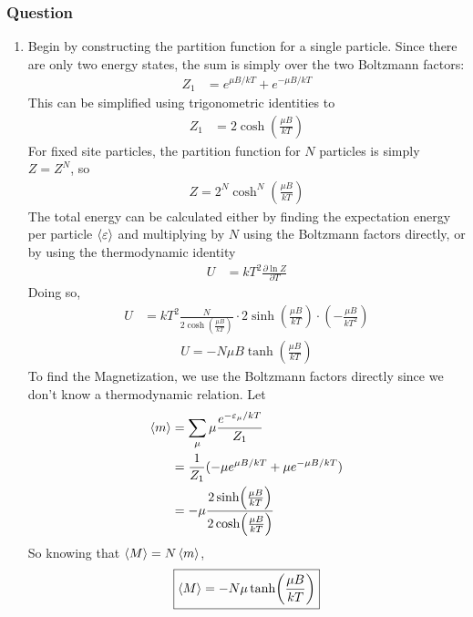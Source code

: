 \subsubsection{Question}
\begin{enumerate}
	\item
		Begin by constructing the partition function for a single particle.
		Since there are only two energy states, the sum is simply over the
		two Boltzmann factors:
		\begin{align*}
			Z_1 &= e^{{\mu} B/kT} + e^{-{\mu} B/kT}
		\end{align*}
		This can be simplified using trigonometric identities to
		\begin{align*}
			Z_1 &= 2 \cosh (\frac{{\mu} B}{kT})
		\end{align*}
		For fixed site particles, the partition function for $N$ particles
		is simply $Z = Z^N$, so
		\begin{align}
			\boxed{
			Z = 2^N \cosh^N (\frac{{\mu} B}{kT})
			}
		\end{align}
		The total energy can be calculated either by finding the expectation
		energy per particle $\expval{\varepsilon }$ and multiplying by $N$ using the
		Boltzmann factors directly, or by using the thermodynamic identity
		\begin{align*}
			 U &= kT^2 \frac{\partial \ln Z}{\partial T}
		\end{align*}
		Doing so,
		\begin{align*}
			U &= kT^2 \frac{N}{2\cosh(\frac{{\mu} B}{kT})}\cdot 2\sinh(\frac{{\mu} B}{kT})
				{\cdot} (-\frac{{\mu} B}{kT^2})
		\end{align*}
		\begin{align}
			\boxed{
			U = -N{\mu} B \tanh (\frac{{\mu} B}{kT})
			}
		\end{align}
		To find the Magnetization, we use the Boltzmann factors directly since
		we don't know a thermodynamic relation. Let
		\begin{align*}
			\expval{m} &= \sum_{\mu} {\mu} \frac{e^{-\varepsilon _{\mu}/kT}}{Z_1} \\
			{} &= \frac{1}{Z_1}( -{\mu} e^{{\mu} B/kT} + {\mu} e^{-{\mu} B/kT} ) \\
			{} &= -{\mu} \frac{2\sinh(\frac{{\mu} B}{kT})}{2\cosh(\frac{{\mu} B}{kT})}
		\end{align*}
		So knowing that $\expval{M} = N\expval{m}$,
		\begin{align}
			\boxed{
			\expval{M} = -N{\mu} \tanh(\frac{{\mu} B}{kT})
			}
		\end{align}

\end{enumerate}
